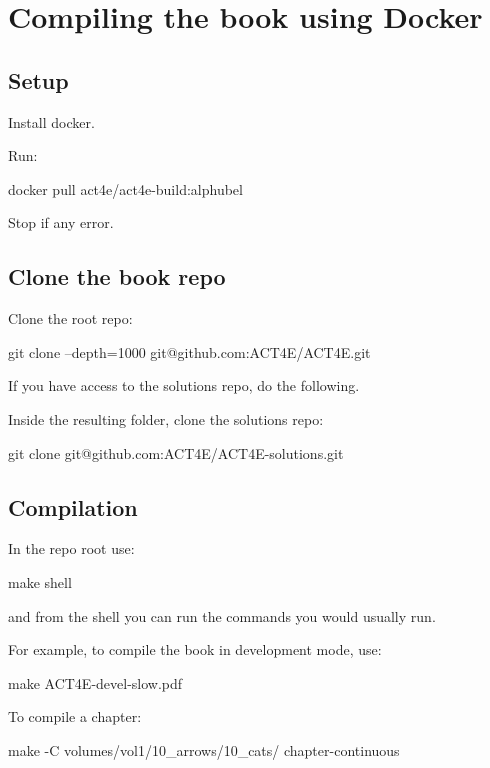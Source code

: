 
\section{Compiling the book using Docker}
\label{sec:compile-docker}

\subsection{Setup}

Install docker.

Run:
%
\begin{console}
    docker pull act4e/act4e-build:alphubel
\end{console}
%
Stop if any error.

\subsection{Clone the book repo}

Clone the root repo:
%
\begin{console}
    git clone --depth=1000 git@github.com:ACT4E/ACT4E.git
\end{console}

If you have access to the solutions repo, do the following.

Inside the resulting folder, clone the solutions repo:
%
\begin{console}
    git clone git@github.com:ACT4E/ACT4E-solutions.git
\end{console}

\subsection{Compilation}

In the repo root use:
%
\begin{console}
    make shell
\end{console}
%
and from the shell you can run the commands you would usually run.

For example, to compile the book in development mode, use:
%
\begin{console}
    make ACT4E-devel-slow.pdf
\end{console}
%
To compile a chapter:
%
\begin{console}
    make -C volumes/vol1/10_arrows/10_cats/ chapter-continuous
\end{console}

